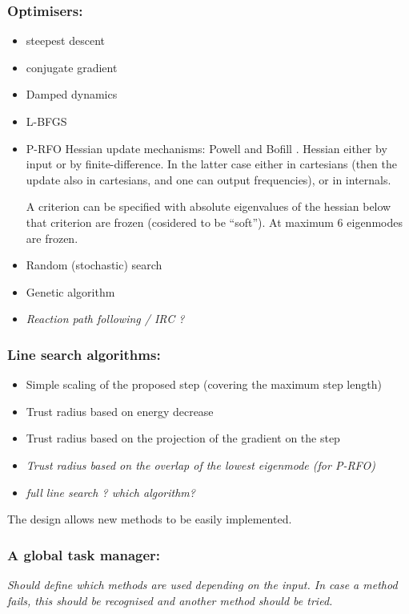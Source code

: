 \documentclass{article}
\begin{document}
\subsubsection{Optimisers:}
\begin{itemize}
\item steepest descent
\item conjugate gradient
\item Damped dynamics
\item L-BFGS
\item P-RFO Hessian update mechanisms: Powell \cite{pow71} and Bofill
  \cite{bof94}. Hessian either by input or by finite-difference. In the latter
  case either in cartesians (then the update also in cartesians, and one can
  output frequencies), or in internals.

  A criterion can be specified with absolute eigenvalues of the hessian below
  that criterion are frozen (cosidered to be ``soft''). At maximum 6
  eigenmodes are frozen.
\item Random (stochastic) search \cite{brooks57,luusj73}
\item Genetic algorithm \cite{holland75,goldberg89,haupth98}
\item \emph{Reaction path following / IRC ?}
\end{itemize}

\subsubsection{Line search algorithms:}
\begin{itemize}
\item Simple scaling of the proposed step (covering the maximum step length)
\item Trust radius based on energy decrease
\item Trust radius based on the projection of the gradient on the step
\item \emph{Trust radius based on the overlap of the lowest eigenmode (for P-RFO)}
\item \emph{full line search ? which algorithm?}
\end{itemize}
The design allows new methods to be easily implemented.

\subsubsection{A global task manager:}

\emph{Should define which methods are used depending on the input. In case a
  method fails, this should be recognised and another method should be tried.}
\end{document}
